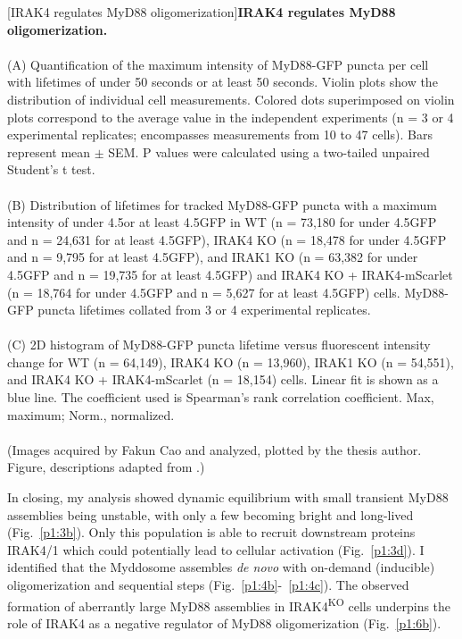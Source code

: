 \begin{centering}
\captionsetup{parbox=none}
[IRAK4 regulates MyD88 oligomerization]{\textbf{IRAK4 regulates MyD88 oligomerization.}
\\
\\
(A) Quantification of the maximum intensity of MyD88-GFP puncta per cell with lifetimes of under 50 seconds or at least 50 seconds. Violin plots show the distribution of individual cell measurements. Colored dots superimposed on violin plots correspond to the average value in the independent experiments (n = 3 or 4 experimental replicates; encompasses measurements from 10 to 47 cells). Bars represent mean $\pm$ SEM. P values were calculated using a two-tailed unpaired Student's t test.
\\
\\
(B) Distribution of lifetimes for tracked MyD88-GFP puncta with a maximum intensity of under 4.5\times or at least 4.5\times GFP in WT (n = 73,180 for under 4.5\times GFP and n = 24,631 for at least 4.5\times GFP), IRAK4 KO (n = 18,478 for under 4.5\times GFP and n = 9,795 for at least 4.5\times GFP), and IRAK1 KO (n = 63,382 for under 4.5\times GFP and n = 19,735 for at least 4.5\times GFP) and IRAK4 KO + IRAK4-mScarlet (n = 18,764 for under 4.5\times GFP and n = 5,627 for at least 4.5\times GFP) cells. MyD88-GFP puncta lifetimes collated from 3 or 4 experimental replicates.
\\
\\
(C) 2D histogram of MyD88-GFP puncta lifetime versus fluorescent intensity change for WT (n = 64,149), IRAK4 KO (n = 13,960), IRAK1 KO (n = 54,551), and IRAK4 KO + IRAK4-mScarlet (n = 18,154) cells. Linear fit is shown as a blue line. The coefficient used is Spearman’s rank correlation coefficient. Max, maximum; Norm., normalized.
\\
\\
(Images acquired by Fakun Cao and analyzed, plotted by the thesis author. Figure, descriptions adapted from \autocite{Deliz-Aguirre_2021}.)}
\label{p1:6b}
\end{centering}

In closing, my analysis showed dynamic equilibrium with small transient MyD88 assemblies being unstable, with only a few becoming bright and long-lived (Fig.~\ref{p1:3b}). Only this population is able to recruit downstream proteins IRAK4/1 which could potentially lead to cellular activation (Fig.~\ref{p1:3d}). I identified that the Myddosome assembles \emph{de novo} with on-demand (inducible) oligomerization and sequential steps (Fig.~\ref{p1:4b}-~\ref{p1:4c}). The observed formation of aberrantly large MyD88 assemblies in IRAK4\textsuperscript{KO} cells underpins the role of IRAK4 as a negative regulator of MyD88 oligomerization (Fig.~\ref{p1:6b}).


